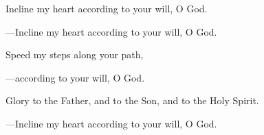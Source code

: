 \responsory
\begin{hangpar}

Incline my heart according to your will, O God.

{\color{red}---\thinspace}Incline my heart according to your will, O God.

\medskip Speed my steps along your path,

{\color{red}---\thinspace}according to your will, O God.

\medskip Glory to the Father, and to the Son, and to the Holy Spirit.

{\color{red}---\thinspace}Incline my heart according to your will, O God.
\end{hangpar}

